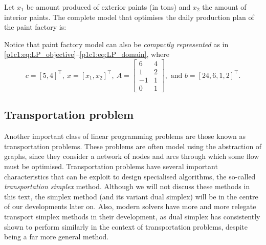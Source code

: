 Let $x_1$ be amount produced of exterior paints (in tons) and $x_2$ the amount of interior paints. The complete model that optimises the daily production plan of the paint factory is:
%
%
Notice that paint factory model can also be \emph{compactly represented} as in \eqref{p1c1:eq:LP_objective}--\eqref{p1c1:eq:LP_domain}, where
%
\begin{equation*}
	c = [5, 4]^\top, \ x = [x_1, x_2]^\top, \ A = \begin{bmatrix} 6 & 4 \\ 1 & 2 \\ -1 & 1 \\0 & 1 \end{bmatrix}, \text{ and } b = [24, 6, 1, 2]^\top.	
\end{equation*}
%


\subsection{Transportation problem}

Another important class of linear programming problems are those known as transportation problems. These problems are often model using the abstraction of graphs, since they consider a network of nodes and arcs through which some flow must be optimised. Transportation problems have several important characteristics that can be exploit to design specialised algorithms, the so-called \emph{transportation simplex} method. Although we will not discuss these methods in this text, the simplex method (and its variant dual simplex) will be in the centre of our developments later on. Also, modern solvers have more and more relegate transport simplex methods in their development, as dual simplex has consistently shown to perform similarly in the context of transportation problems, despite being a far more general method. 

